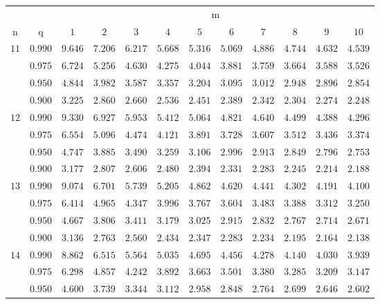 \documentclass[11pt]{article}
\theoremstyle{definition}
\begin{document}
\begin{table}[H]
	\begin{tabularx}{\linewidth}{c | c | c c c c c c c c c c}
		& & \multicolumn{10}{c}{m}\\
		\cline{3-12}
		n & q & $1$ & $2$ & $3$ & $4$ & $5$ & $6$ & $7$ & $8$ & $9$ & $10$\\
		\hline
		$11$ & $0.990$ & $9.646$ & $7.206$ & $6.217$ & $5.668$ & $5.316$ & $5.069$ & $4.886$ & $4.744$ & $4.632$ & $4.539$ \\
		& $0.975$ & $6.724$ & $5.256$ & $4.630$ & $4.275$ & $4.044$ & $3.881$ & $3.759$ & $3.664$ & $3.588$ & $3.526$ \\
		& $0.950$ & $4.844$ & $3.982$ & $3.587$ & $3.357$ & $3.204$ & $3.095$ & $3.012$ & $2.948$ & $2.896$ & $2.854$ \\
		& $0.900$ & $3.225$ & $2.860$ & $2.660$ & $2.536$ & $2.451$ & $2.389$ & $2.342$ & $2.304$ & $2.274$ & $2.248$ \\
		$12$ & $0.990$ & $9.330$ & $6.927$ & $5.953$ & $5.412$ & $5.064$ & $4.821$ & $4.640$ & $4.499$ & $4.388$ & $4.296$ \\
		& $0.975$ & $6.554$ & $5.096$ & $4.474$ & $4.121$ & $3.891$ & $3.728$ & $3.607$ & $3.512$ & $3.436$ & $3.374$ \\
		& $0.950$ & $4.747$ & $3.885$ & $3.490$ & $3.259$ & $3.106$ & $2.996$ & $2.913$ & $2.849$ & $2.796$ & $2.753$ \\
		& $0.900$ & $3.177$ & $2.807$ & $2.606$ & $2.480$ & $2.394$ & $2.331$ & $2.283$ & $2.245$ & $2.214$ & $2.188$ \\
		$13$ & $0.990$ & $9.074$ & $6.701$ & $5.739$ & $5.205$ & $4.862$ & $4.620$ & $4.441$ & $4.302$ & $4.191$ & $4.100$ \\
		& $0.975$ & $6.414$ & $4.965$ & $4.347$ & $3.996$ & $3.767$ & $3.604$ & $3.483$ & $3.388$ & $3.312$ & $3.250$ \\
		& $0.950$ & $4.667$ & $3.806$ & $3.411$ & $3.179$ & $3.025$ & $2.915$ & $2.832$ & $2.767$ & $2.714$ & $2.671$ \\
		& $0.900$ & $3.136$ & $2.763$ & $2.560$ & $2.434$ & $2.347$ & $2.283$ & $2.234$ & $2.195$ & $2.164$ & $2.138$ \\
		$14$ & $0.990$ & $8.862$ & $6.515$ & $5.564$ & $5.035$ & $4.695$ & $4.456$ & $4.278$ & $4.140$ & $4.030$ & $3.939$ \\
		& $0.975$ & $6.298$ & $4.857$ & $4.242$ & $3.892$ & $3.663$ & $3.501$ & $3.380$ & $3.285$ & $3.209$ & $3.147$ \\
		& $0.950$ & $4.600$ & $3.739$ & $3.344$ & $3.112$ & $2.958$ & $2.848$ & $2.764$ & $2.699$ & $2.646$ & $2.602$ \\

\end{tabularx}
\end{table}
\end{document}
